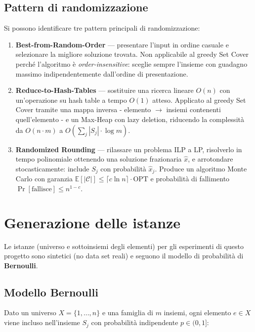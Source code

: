 \documentclass[12pt, a4paper]{article}
\begin{document}
\subsection*{Pattern di randomizzazione}

Si possono identificare tre pattern principali di randomizzazione:

\begin{enumerate}
    \item \textbf{Best-from-Random-Order} — presentare l'input in ordine casuale 
    e selezionare la migliore soluzione trovata. 
    Non applicabile al greedy Set Cover perché l'algoritmo è 
    \textit{order-insensitive}: sceglie sempre l'insieme con guadagno massimo 
    indipendentemente dall'ordine di presentazione.

    \item \textbf{Reduce-to-Hash-Tables} — sostituire una ricerca lineare $O(n)$ 
    con un'operazione su hash table a tempo $O(1)$ atteso. 
    Applicato al greedy Set Cover tramite una mappa inversa - 
    elemento $\rightarrow$ insiemi contenenti quell'elemento - e un Max-Heap 
    con lazy deletion, riducendo la complessità da $O(n \cdot m)$ 
    a $O(\sum_j|S_j| \cdot \log m)$.

    \item \textbf{Randomized Rounding} — rilassare un problema ILP a LP, 
    risolverlo in tempo polinomiale ottenendo una soluzione frazionaria $\hat{x}$, 
    e arrotondare stocasticamente: include $S_j$ con probabilità $\hat{x}_j$. 
    Produce un algoritmo Monte Carlo con garanzia 
    $\mathbb{E}[|\mathcal{C}|] \leq \lceil c \ln n \rceil \cdot \mathrm{OPT}$ 
    e probabilità di fallimento $\Pr[\text{fallisce}] \leq n^{1-c}$.
\end{enumerate}


\section{Generazione delle istanze}

Le istanze (universo e sottoinsiemi degli elementi) per gli esperimenti di questo progetto sono sintetici (no data set reali) e seguono il modello di probabilità di \textbf{Bernoulli}.

\subsection*{Modello Bernoulli}

Dato un universo $X = \{1, \ldots, n\}$ e una famiglia di $m$ insiemi, 
ogni elemento $e \in X$ viene incluso nell'insieme $S_j$ con probabilità 
indipendente $p \in (0, 1]$:
\end{document}
